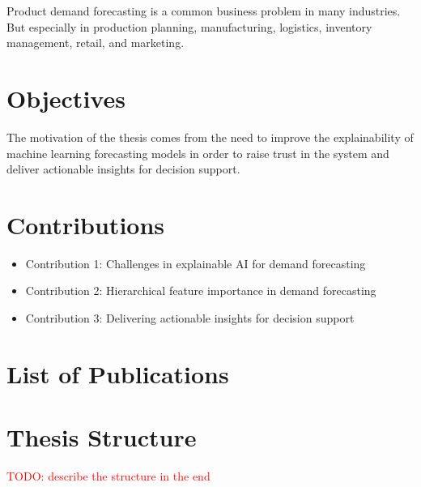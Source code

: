 

Product demand forecasting is a common business problem in many industries.
But especially in production planning, manufacturing, logistics, inventory management, retail, and marketing.


\section[Objectives]{Objectives}



The motivation of the thesis comes from the need to improve the explainability of machine learning forecasting models in order to raise trust in the system and deliver actionable insights for decision support.





\section[Contributions]{Contributions}

\begin{itemize}
    \item Contribution 1: Challenges in explainable AI for demand forecasting
    \item Contribution 2: Hierarchical feature importance in demand forecasting
    \item Contribution 3: Delivering actionable insights for decision support
\end{itemize}


\section[Publications]{List of Publications}




\section[Thesis Structure]{Thesis Structure}
\textcolor{red}{TODO: describe the structure in the end}


